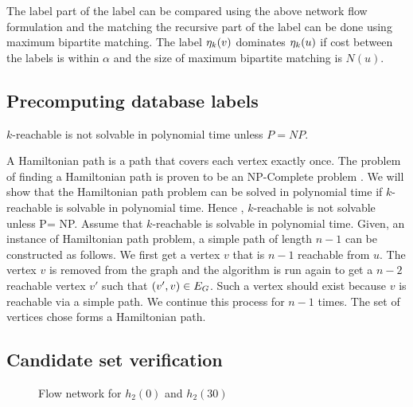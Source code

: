  The \khop label part of the \ncl label can
be compared using the above network flow formulation and the matching the recursive
part of the \ncl label can be done using maximum bipartite matching. The \ncl label
$\eta_{k}(v)$ dominates $\eta_{k}(u)$ if cost between the \khop labels is within
$\alpha$ and the size of maximum bipartite matching is $N(u)$.

\subsection{Precomputing database \khop labels}
\begin{thm}
$k$-reachable is not solvable in polynomial time unless $P=NP$.

\begin{myproof}
A Hamiltonian path is a path that covers each vertex exactly once.
The problem of finding a Hamiltonian path is proven to be an NP-Complete
problem \cite{npcomplete}.
We will show that the Hamiltonian path problem can be solved in polynomial
time if $k$-reachable is solvable in polynomial time.  
Hence , $k$-reachable is not solvable unless P=
NP. Assume that $k$-reachable is solvable in polynomial time. Given,
an instance of Hamiltonian path problem, a simple path of length $n-1$
can be constructed as follows. We first get a vertex $v$ that is $n-1$
reachable from $u$.  The vertex $v$ is removed from the graph and the
algorithm is run again to get a $n-2$ reachable vertex $v'$ such that
$(v',v) \in E_G$. Such a vertex should exist because $v$ is reachable
via a simple path. We continue this process for $n-1$ times. The set of
vertices chose forms a Hamiltonian path.
\end{myproof}
\end{thm}

\subsection{Candidate set verification}


\begin{figure}[!h]
    \centering
{}
    \caption{Flow network for $h_2(0)$ and $h_2(30)$}
	\label{fig:Hflow}
\end{figure}
